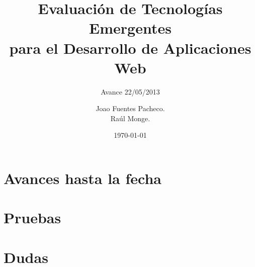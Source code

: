 \documentclass{beamer}
\title{Evaluación de Tecnologías Emergentes \\ para el Desarrollo de Aplicaciones Web}
\subtitle{Avance 22/05/2013}
\author{Joao Fuentes Pacheco.\\
		Raúl Monge.}
\institute[]{Universidad Técnica Federico Santa María}
\date{\today}
\begin{document}
    \frame{\titlepage}
    \frame{\tableofcontents}
	\section{Avances hasta la fecha} %
	     
	     
	\section{Pruebas}
		
		
	\section{Dudas}
		
\end{document}

